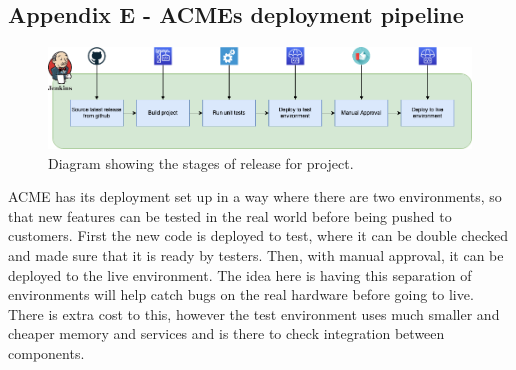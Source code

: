\subsection{Appendix E - ACMEs deployment pipeline}
\label{sec:AppendixE}

  \begin{figure}[H]
    \centering
    \includegraphics[width=12cm]{assets/relasePipeline.drawio.png}
    \caption{Diagram showing the stages of release for project.}
    \label{fig:releasePipeline}
  \end{figure}

  ACME has its deployment set up in a way where there are two environments, so that new features can be tested in the real world before being pushed to customers.
  First the new code is deployed to test, where it can be double checked and made sure that it is ready by testers. Then, with manual approval, it can be 
  deployed to the live environment. The idea here is having this separation of environments will help catch bugs on the real hardware before going to live.
  There is extra cost to this, however the test environment uses much smaller and cheaper memory and services and is there to check integration between 
  components.

